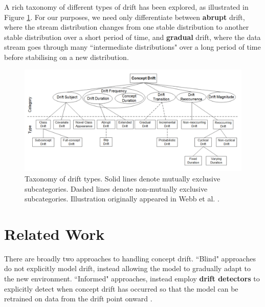 A rich taxonomy of different types of drift has been explored, as illustrated in Figure \ref{fig:drift_taxonomy}. For our purposes, we need only differentiate between {\bf abrupt} drift, where the stream distribution changes from one stable distribution to another stable distribution over a short period of time, and {\bf gradual} drift, where the data stream goes through many ``intermediate distributions" over a long period of time before stabilising on a new distribution.

\begin{figure}
    \centering
    \includegraphics[width=\textwidth]{images/drift_taxonomy.png}
    \caption{Taxonomy of drift types. Solid lines denote mutually exclusive subcategories. Dashed lines denote non-mutually exclusive subcategories. Illustration originally appeared in Webb et al. \cite{characterizing_drift}.}
    \label{fig:drift_taxonomy}
\end{figure}



\section{Related Work} \label{background:related_work}

There are broadly two approaches to handling concept drift. ``Blind" approaches do not explicitly model drift, instead allowing the model to gradually adapt to the new environment. ``Informed" approaches, instead employ {\bf drift detectors} to explicitly detect when concept drift has occurred so that the model can be retrained on data from the drift point onward \cite{gama_survey}.

